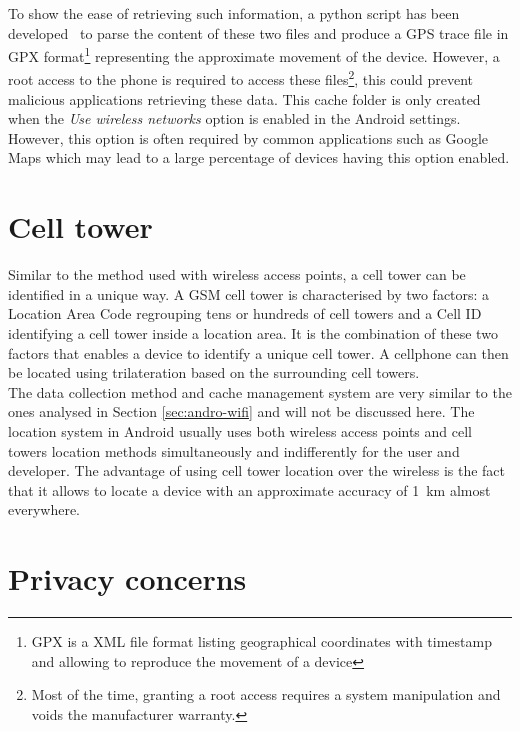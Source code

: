 To show the ease of retrieving such information, a python script has been developed~\cite{soft-locdump} to parse the content of these two files and produce a GPS trace file in GPX format\footnote{GPX is a XML file format listing geographical coordinates with timestamp and allowing to reproduce the movement of a device} representing the approximate movement of the device.
However, a root access to the phone is required to access these files\footnote{Most of the time, granting a root access requires a system manipulation and voids the manufacturer warranty.}, this could prevent malicious applications retrieving these data.
This cache folder is only created when the \emph{Use wireless networks} option is enabled in the Android settings.
However, this option is often required by common applications such as Google Maps which may lead to a large percentage of devices having this option enabled.

\section{Cell tower}
\label{sec:loc-cell-tower}
Similar to the method used with wireless access points, a cell tower can be identified in a unique way.
A GSM cell tower is characterised by two factors: a Location Area Code regrouping tens or hundreds of cell towers and a Cell ID identifying a cell tower inside a location area.
It is the combination of these two factors that enables a device to identify a unique cell tower.
A cellphone can then be located using trilateration based on the surrounding cell towers.\\

The data collection method and cache management system are very similar to the ones analysed in Section \ref{sec:andro-wifi} and will not be discussed here.
The location system in Android usually uses both wireless access points and cell towers location methods simultaneously and indifferently for the user and developer.
The advantage of using cell tower location over the wireless is the fact that it allows to locate a device with an approximate accuracy of 1~km almost everywhere.


\section{Privacy concerns}
\label{sec:andro-priv}

